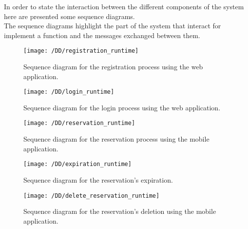 In order to state the interaction between the different components of the system here are presented some sequence diagrams.
\\The sequence diagrams highlight the part of the system that interact for implement a function and the messages exchanged between them.


\begin{figure}[!ht]
  \centering
  \vspace{0.2cm}
  \texttt{[image: /DD/registration\_runtime]}\\
  \vspace{0.4cm}
  \caption{Sequence diagram for the registration process using the web application.} 
  \label{fig:registration_runtime} 
\end{figure}
\newpage
\begin{figure}[!ht]
  \centering
  \vspace{0.2cm}
  \texttt{[image: /DD/login\_runtime]}\\
  \vspace{0.4cm}
  \caption{Sequence diagram for the login process using the web application.} 
  \label{fig:login_runtime} 
\end{figure}
\newpage
\begin{figure}[!ht]
  \centering
  \vspace{0.2cm}
  \texttt{[image: /DD/reservation\_runtime]}\\
  \vspace{0.4cm}
  \caption{Sequence diagram for the reservation process using the mobile application.} 
  \label{fig:reservation_runtime} 
\end{figure}
\newpage
\begin{figure}[!ht]
  \centering
  \vspace{0.2cm}
  \texttt{[image: /DD/expiration\_runtime]}\\
  \vspace{0.4cm}
  \caption{Sequence diagram for the reservation's expiration.} 
  \label{fig:expiration_runtime} 
\end{figure}
\newpage
\begin{figure}[!ht]
  \centering
  \vspace{0.2cm}
  \texttt{[image: /DD/delete\_reservation\_runtime]}\\
  \vspace{0.4cm}
  \caption{Sequence diagram for the reservation's deletion using the mobile application.} 
  \label{fig:delete_reservation_runtime} 
\end{figure}
